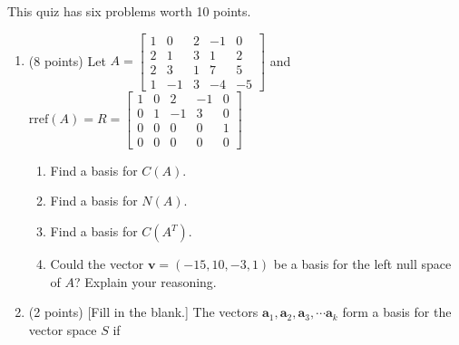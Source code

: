 \documentclass[11pt,fleqn]{article}
\def\bbm{\begin{bmatrix}}
\def\ebm{\end{bmatrix}}
\begin{document}
\renewcommand{\headrulewidth}{0pt}
\newcommand{\blank}[1]{\rule{#1}{0.75pt}}
\renewcommand{\d}{\displaystyle}

This quiz has six problems worth 10 points.
\begin{enumerate}
\item (8 points) Let $A=\bbm 1&0&2&-1&0\\ 2&1&3&1&2\\ 2&3&1&7&5\\1&-1&3&-4&-5\ebm$ and $\text{rref}(A)=R=\bbm 1&0&2&-1&0\\ 0&1&-1&3&0 \\ 0&0&0&0&1\\0&0&0&0&0 \ebm$
	\begin{enumerate}
	\item Find a basis for $C(A)$.
	\vfill
	\item Find a basis for $N(A).$
	\vfill
	\item Find a basis for $C(A^T)$.
	\vfill
	\item Could the vector $\mathbf{v} = (-15, 10,-3,1)$ be a basis for the left null space of $A$? Explain your reasoning.
	\vfill
	\vfill
	\end{enumerate}
\newpage
\thispagestyle{empty}
\item (2 points) [Fill in the blank.] The vectors $\mathbf{a}_1, \mathbf{a}_2,\mathbf{a}_3, \cdots \mathbf{a}_k$ form a basis for the vector space $S$ if 
\end{enumerate}
\end{document}
